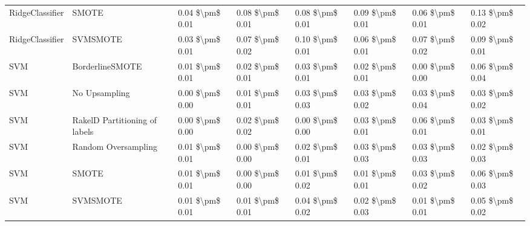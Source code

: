 \begin{tabular}{llllllll}
                RidgeClassifier &                         SMOTE & 0.04 \$\textbackslash pm\$ 0.01 &           0.08 \$\textbackslash pm\$ 0.01 &       0.08 \$\textbackslash pm\$ 0.01 &        0.09 \$\textbackslash pm\$ 0.01 &                         0.06 \$\textbackslash pm\$ 0.01 &     0.13 \$\textbackslash pm\$ 0.02 \\
                RidgeClassifier &                      SVMSMOTE & 0.03 \$\textbackslash pm\$ 0.01 &           0.07 \$\textbackslash pm\$ 0.02 &       0.10 \$\textbackslash pm\$ 0.01 &        0.06 \$\textbackslash pm\$ 0.01 &                         0.07 \$\textbackslash pm\$ 0.02 &     0.09 \$\textbackslash pm\$ 0.01 \\
                            SVM &               BorderlineSMOTE & 0.01 \$\textbackslash pm\$ 0.01 &           0.02 \$\textbackslash pm\$ 0.01 &       0.03 \$\textbackslash pm\$ 0.01 &        0.02 \$\textbackslash pm\$ 0.01 &                         0.00 \$\textbackslash pm\$ 0.00 &     0.06 \$\textbackslash pm\$ 0.04 \\
                            SVM &                 No Upsampling & 0.00 \$\textbackslash pm\$ 0.00 &           0.01 \$\textbackslash pm\$ 0.01 &       0.03 \$\textbackslash pm\$ 0.03 &        0.03 \$\textbackslash pm\$ 0.02 &                         0.03 \$\textbackslash pm\$ 0.04 &     0.03 \$\textbackslash pm\$ 0.02 \\
                            SVM & RakelD Partitioning of labels & 0.00 \$\textbackslash pm\$ 0.00 &           0.02 \$\textbackslash pm\$ 0.02 &       0.00 \$\textbackslash pm\$ 0.00 &        0.03 \$\textbackslash pm\$ 0.01 &                         0.06 \$\textbackslash pm\$ 0.01 &     0.03 \$\textbackslash pm\$ 0.01 \\
                            SVM &           Random Oversampling & 0.01 \$\textbackslash pm\$ 0.01 &           0.00 \$\textbackslash pm\$ 0.00 &       0.02 \$\textbackslash pm\$ 0.01 &        0.03 \$\textbackslash pm\$ 0.03 &                         0.03 \$\textbackslash pm\$ 0.03 &     0.02 \$\textbackslash pm\$ 0.03 \\
                            SVM &                         SMOTE & 0.01 \$\textbackslash pm\$ 0.01 &           0.00 \$\textbackslash pm\$ 0.00 &       0.01 \$\textbackslash pm\$ 0.02 &        0.01 \$\textbackslash pm\$ 0.01 &                         0.03 \$\textbackslash pm\$ 0.02 &     0.06 \$\textbackslash pm\$ 0.03 \\
                            SVM &                      SVMSMOTE & 0.01 \$\textbackslash pm\$ 0.01 &           0.01 \$\textbackslash pm\$ 0.01 &       0.04 \$\textbackslash pm\$ 0.02 &        0.02 \$\textbackslash pm\$ 0.03 &                         0.01 \$\textbackslash pm\$ 0.01 &     0.05 \$\textbackslash pm\$ 0.02 \\

\end{tabular}
